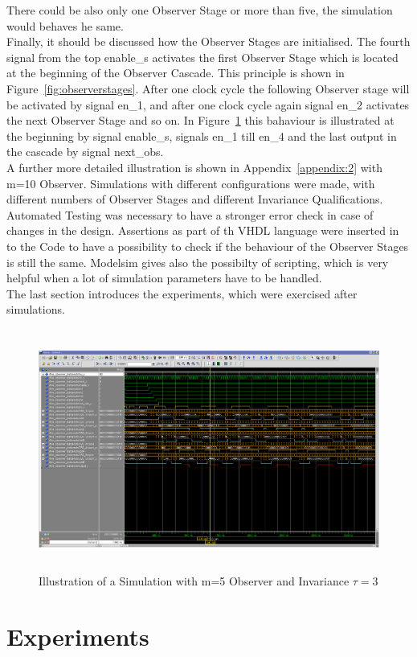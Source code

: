 There could be also only one Observer Stage or more than five, the simulation would behaves he same. \\  
Finally, it should be discussed how the Observer Stages are initialised. The fourth signal from the top enable\_s activates the first Observer Stage which is located at the beginning of the
Observer Cascade. This principle is shown in Figure~\ref{fig:observerstages}. After one clock cycle the following Observer stage will be activated by signal en\_1, and after one clock cycle again signal
en\_2 activates the next Observer Stage and so on. 
In Figure~\ref{fig:simulation:five} this bahaviour is illustrated at the beginning by signal enable\_s, signals en\_1 till en\_4 and the last output in the cascade by signal next\_obs.\\

A further more detailed illustration is shown in Appendix~\ref{appendix:2} with m=10 Observer.
Simulations with different configurations were made, with different numbers of Observer Stages and different Invariance Qualifications.
Automated Testing was necessary to have a stronger error check in case of changes in the design. Assertions as part of th VHDL language were inserted in to the Code to 
have a possibility to check if the behaviour of the Observer Stages is still the same. 
Modelsim gives also the possibilty of scripting,  which is very helpful when a lot of simulation parameters have to be handled. \\  
The last section introduces the experiments, which were exercised after simulations.  


 \begin{figure}[]
\centering
\includegraphics[width=650px,height=300px,angle=-90]{../../pictures/Modelsim/5_Observer_tb_1.png}
\caption[Modelsim Simulation of 5 Observer]{Illustration of a Simulation with m=5 Observer and Invariance $\tau=3$}
\label{fig:simulation:five}
\end{figure}

\newpage
\section{Experiments}
%
